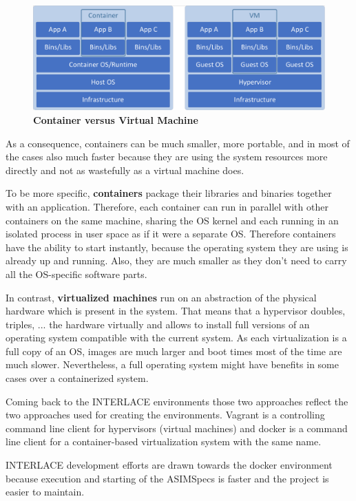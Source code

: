 \begin{figure}[htbp]
  \centering
  \includegraphics[width=1.0\textwidth, clip, trim=1mm 1mm 1mm 1mm]{Figures/container_vs_vm}
  \caption{\bf\small Container versus Virtual Machine}
  \label{fig:docker-env-container-vs-vm}
\end{figure}

As a consequence, containers can be much smaller, more portable, and in most of the cases also much faster because they are using the system resources more directly and not as wastefully as a virtual machine does.

To be more specific, \textbf{containers} package their libraries and binaries together with an application. Therefore, each container can run in parallel with other containers on the same machine, sharing the OS kernel and each running in an isolated process in user space as if it were a separate OS. Therefore containers have the ability to start instantly, because the operating system they are using is already up and running. Also, they are much smaller as they don't need to carry all the OS-specific software parts.

In contrast, \textbf{virtualized machines} run on an abstraction of the physical hardware which is present in the system. That means that a hypervisor doubles, triples, ... the hardware virtually and allows to install full versions of an operating system compatible with the current system. As each virtualization is a full copy of an OS, images are much larger and boot times most of the time are much slower. Nevertheless, a full operating system might have benefits in some cases over a containerized system.

Coming back to the INTERLACE environments those two approaches reflect the two approaches used for creating the environments. Vagrant is a controlling command line client for hypervisors (virtual machines) and docker is a command line client for a container-based virtualization system with the same name.

INTERLACE development efforts are drawn towards the docker environment because execution and starting of the ASIMSpecs is faster and the project is easier to maintain.
